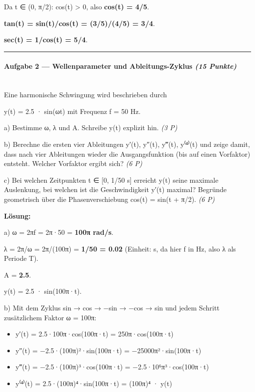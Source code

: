 \documentclass[11pt, a4paper]{article}
\begin{document}
Da t ∈ (0, π/2): cos(t) > 0, also \textbf{cos(t) = 4/5}.

\textbf{tan(t) = sin(t)/cos(t) = (3/5)/(4/5) = 3/4}.

\textbf{sec(t) = 1/cos(t) = 5/4}.



\noindent\textcolor{rulegray}{\rule{\linewidth}{0.4pt}}


\paragraph{Aufgabe 2 — Wellenparameter und Ableitungs-Zyklus \textit{(15 Punkte)}}\mbox{}\\[2pt]

Eine harmonische Schwingung wird beschrieben durch

y(t) = 2.5 · sin(ωt) mit Frequenz f = 50 Hz.


a) Bestimme ω, λ und A. Schreibe y(t) explizit hin. \textit{(3 P)}


b) Berechne die ersten vier Ableitungen y′(t), y″(t), y‴(t), y⁽⁴⁾(t) und zeige damit, dass nach vier Ableitungen wieder die Ausgangsfunktion (bis auf einen Vorfaktor) entsteht. Welcher Vorfaktor ergibt sich? \textit{(6 P)}


c) Bei welchen Zeitpunkten t ∈ [0, 1/50 s] erreicht y(t) seine maximale Auslenkung, bei welchen ist die Geschwindigkeit y′(t) maximal? Begründe geometrisch über die Phasenverschiebung cos(t) = sin(t + π/2). \textit{(6 P)}


\textbf{Lösung:}


a) ω = 2πf = 2π·50 = \textbf{100π rad/s}.

λ = 2π/ω = 2π/(100π) = \textbf{1/50 = 0.02} (Einheit: s, da hier f in Hz, also λ als Periode T).

A = \textbf{2.5}.

y(t) = 2.5 · sin(100π·t).


b) Mit dem Zyklus sin → cos → −sin → −cos → sin und jedem Schritt zusätzlichem Faktor ω = 100π:

\begin{itemize}
  \item y′(t) = 2.5·100π·cos(100π·t) = 250π·cos(100π·t)
  \item y″(t) = −2.5·(100π)²·sin(100π·t) = −25000π²·sin(100π·t)
  \item y‴(t) = −2.5·(100π)³·cos(100π·t) = −2.5·10⁶π³·cos(100π·t)
  \item y⁽⁴⁾(t) = 2.5·(100π)⁴·sin(100π·t) = (100π)⁴ · y(t)
\end{itemize}
\end{document}
